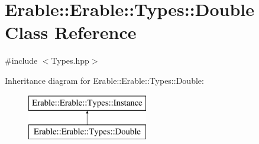 \hypertarget{class_erable_1_1_erable_1_1_types_1_1_double}{}\section{Erable\+::Erable\+::Types\+::Double Class Reference}
\label{class_erable_1_1_erable_1_1_types_1_1_double}


{\ttfamily \#include $<$Types.\+hpp$>$}

Inheritance diagram for Erable\+::Erable\+::Types\+::Double\+:\begin{figure}[H]
\begin{center}
\leavevmode
\includegraphics[height=2.000000cm]{class_erable_1_1_erable_1_1_types_1_1_double}
\end{center}
\end{figure}
